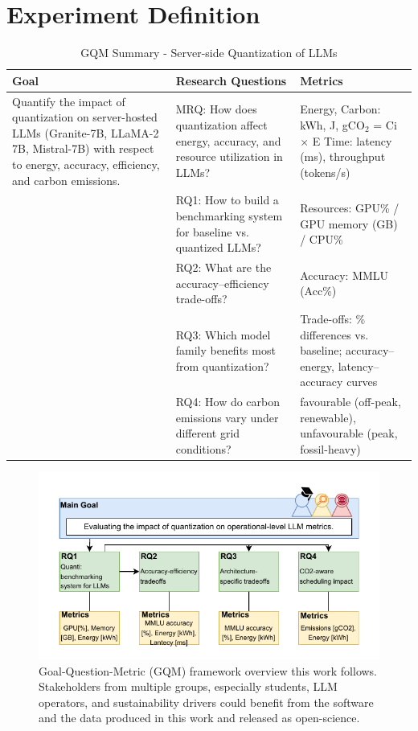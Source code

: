 \newpage
\section{Experiment Definition}
\begin{table}[ht]
    \centering
    \begin{tabularx}{\textwidth}{@{}p{4.5cm} p{6cm} p{6cm}@{}}
        \hline
        \textbf{Goal} & \textbf{Research Questions} & \textbf{Metrics}\\
        \hline
        \midrule
        Quantify the impact of quantization on server-hosted LLMs (Granite-7B, LLaMA-2 7B, Mistral-7B) with respect to energy, accuracy, efficiency, and carbon emissions. & MRQ: How does quantization affect energy, accuracy, and resource utilization in LLMs? & Energy, Carbon: kWh, J, gCO$_2$ = Ci × E
        Time: latency (ms), throughput (tokens/s)\\
        \hline
         & RQ1: How to build a benchmarking system for baseline vs. quantized LLMs? & Resources: GPU\% / GPU memory (GB) / CPU\%\\
         \hline
         & RQ2: What are the accuracy–efficiency trade-offs? & Accuracy: MMLU (Acc\%)\\
         \hline
         & RQ3: Which model family benefits most from quantization? & Trade-offs: \% differences vs. baseline; accuracy–energy, latency–accuracy curves\\
         \hline
         & RQ4: How do carbon emissions vary under different grid conditions? & favourable (off-peak, renewable), unfavourable (peak, fossil-heavy)\\
         \hline
         \bottomrule
    \end{tabularx}
    \caption{GQM Summary - Server-side Quantization of LLMs}
    \label{tab:placeholder}
\end{table}

\begin{figure}[t]
    \centering
    \includegraphics[width=1.05\linewidth]{reportTemplate/figures/gqm.pdf}
    \caption{Goal-Question-Metric (GQM) framework overview this work follows. Stakeholders from multiple groups, especially students, LLM operators, and sustainability drivers could benefit from the software and the data produced in this work and released as open-science.}
    \label{fig:placeholder}
\end{figure}

